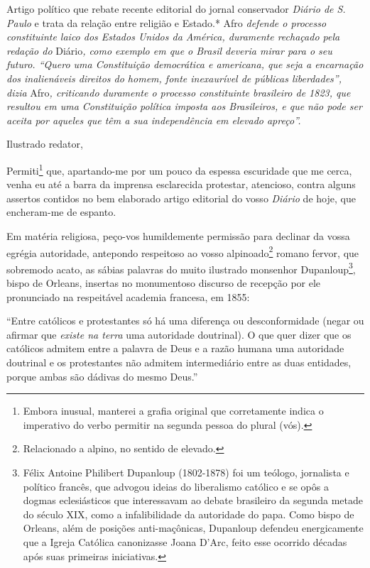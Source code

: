 \begin{didascalia}
Artigo político que rebate recente editorial do jornal conservador\emph{
Diário de S. Paulo }e trata da relação entre religião e Estado.* Afro
\emph{defende o processo constituinte laico dos Estados Unidos da
América, duramente rechaçado pela redação do} Diário\emph{, como exemplo
em que o Brasil deveria mirar para o seu futuro. ``Quero uma Constituição
democrática e americana, que seja a encarnação dos inalienáveis direitos
do homem, fonte inexaurível de públicas liberdades'', dizia} Afro\emph{,
criticando duramente o processo constituinte brasileiro de 1823, que
resultou em uma Constituição política imposta aos Brasileiros, e que não
pode ser aceita por aqueles que têm a sua independência em elevado
apreço''.}
\end{didascalia}

\asterisc{}

Ilustrado redator,

Permiti\footnote{Embora inusual, manterei a grafia original que
  corretamente indica o imperativo do verbo permitir na segunda pessoa
  do plural (vós).} que, apartando-me por um pouco da espessa escuridade
que me cerca, venha eu até a barra da imprensa esclarecida protestar,
atencioso, contra alguns assertos contidos no bem elaborado artigo
editorial do vosso \emph{Diário} de hoje, que encheram-me de espanto.

Em matéria religiosa, peço-vos humildemente permissão para declinar da
vossa egrégia autoridade, antepondo respeitoso ao vosso
alpinoado\footnote{Relacionado a alpino, no sentido de elevado.}
romano fervor, que sobremodo acato, as sábias palavras do muito
ilustrado monsenhor Dupanloup\footnote{Félix Antoine Philibert
  Dupanloup (1802-1878) foi um teólogo, jornalista e político francês,
  que advogou ideias do liberalismo católico e se opôs a dogmas
  eclesiásticos que interessavam ao debate brasileiro da segunda metade
  do século XIX, como a infalibilidade da autoridade do papa. Como bispo
  de Orleans, além de posições anti-maçônicas, Dupanloup defendeu
  energicamente que a Igreja Católica canonizasse Joana D'Arc, feito
  esse ocorrido décadas após suas primeiras iniciativas.}, bispo de
Orleans, insertas no monumentoso discurso de recepção por ele
pronunciado na respeitável academia francesa, em 1855:

``Entre católicos e protestantes só há uma diferença ou desconformidade
(negar ou afirmar que \emph{existe na terra} uma autoridade doutrinal).
O que quer dizer que os católicos admitem entre a palavra de Deus e a
razão humana uma autoridade doutrinal e os protestantes não admitem
intermediário entre as duas entidades, porque ambas são dádivas do mesmo
Deus.''


